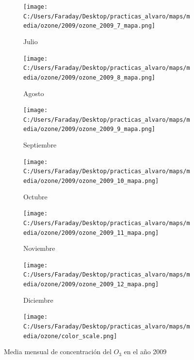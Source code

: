 \documentclass[12pt]{article}
\begin{document}
\begin{figure}[H]
\begin{subfigure}[H]{0.15\textwidth}
\texttt{[image: C:/Users/Faraday/Desktop/practicas\_alvaro/maps/media/ozone/2009/ozone\_2009\_7\_mapa.png]}
\captionsetup{labelformat=empty}
\caption{Julio}
\label{fig:map-ozone-2009-7}
\end{subfigure}
%
\begin{subfigure}[H]{0.15\textwidth}
\texttt{[image: C:/Users/Faraday/Desktop/practicas\_alvaro/maps/media/ozone/2009/ozone\_2009\_8\_mapa.png]}
\captionsetup{labelformat=empty}
\caption{Agosto}
\label{fig:map-ozone-2009-8}
\end{subfigure}
%
\begin{subfigure}[H]{0.15\textwidth}
\texttt{[image: C:/Users/Faraday/Desktop/practicas\_alvaro/maps/media/ozone/2009/ozone\_2009\_9\_mapa.png]}
\captionsetup{labelformat=empty}
\caption{Septiembre}
\label{fig:map-ozone-2009-9}
\end{subfigure}
%
\begin{subfigure}[H]{0.15\textwidth}
\texttt{[image: C:/Users/Faraday/Desktop/practicas\_alvaro/maps/media/ozone/2009/ozone\_2009\_10\_mapa.png]}
\captionsetup{labelformat=empty}
\caption{Octubre}
\label{fig:map-ozone-2009-10}
\end{subfigure}
%
\begin{subfigure}[H]{0.15\textwidth}
\texttt{[image: C:/Users/Faraday/Desktop/practicas\_alvaro/maps/media/ozone/2009/ozone\_2009\_11\_mapa.png]}
\captionsetup{labelformat=empty}
\caption{Noviembre}
\label{fig:map-ozone-2009-11}
\end{subfigure}
%
\begin{subfigure}[H]{0.15\textwidth}
\texttt{[image: C:/Users/Faraday/Desktop/practicas\_alvaro/maps/media/ozone/2009/ozone\_2009\_12\_mapa.png]}
\captionsetup{labelformat=empty}
\caption{Diciembre}
\label{fig:map-ozone-2009-12}
\end{subfigure}

\begin{subfigure}[H]{0.45\textwidth}
\texttt{[image: C:/Users/Faraday/Desktop/practicas\_alvaro/maps/media/ozone/color\_scale.png]}
\captionsetup{labelformat=empty}
\caption{}
\end{subfigure}

\vspace*{-7mm}
\caption{Media mensual de concentración del $O_{3}$ en el año 2009}
\label{fig:map-ozone-2009}
\end{figure}
\end{document}
